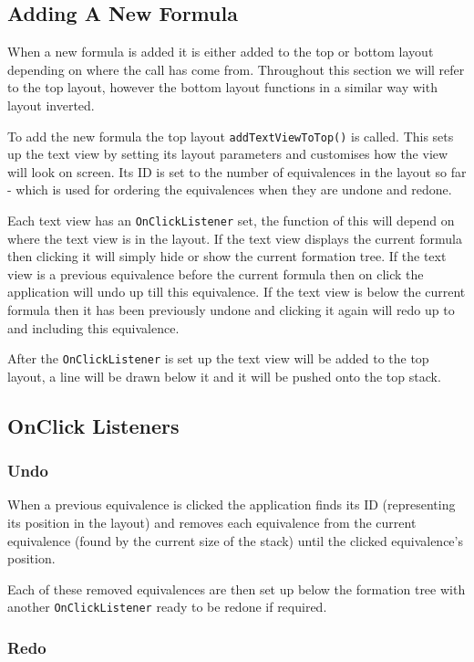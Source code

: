 \documentclass{report}
\begin{document}
\subsection{Adding A New Formula}

When a new formula is added it is either added to the top or bottom layout depending on where the call has come from. Throughout this section we will refer to the top layout, however the bottom layout functions in a similar way with layout inverted.

To add the new formula the top layout {\tt addTextViewToTop()} is called. This sets up the text view by setting its layout parameters and customises how the view will look on screen. Its ID is set to the number of equivalences in the layout so far - which is used for ordering the equivalences when they are undone and redone.

Each text view has an {\tt OnClickListener} set, the function of this will depend on where the text view is in the layout. If the text view displays the current formula then clicking it will simply hide or show the current formation tree. If the text view is a previous equivalence before the current formula then on click the application will undo up till this equivalence. If the text view is below the current formula then it has been previously undone and clicking it again will redo up to and including this equivalence.

After the {\tt OnClickListener} is set up the text view will be added to the top layout, a line will be drawn below it and it will be pushed onto the top stack.

\subsection{OnClick Listeners}

\subsubsection{Undo}

When a previous equivalence is clicked the application finds its ID (representing its position in the layout) and removes each equivalence from the current equivalence (found by the current size of the stack) until the clicked equivalence's position. 

Each of these removed equivalences are then set up below the formation tree with another {\tt OnClickListener} ready to be redone if required.

\subsubsection{Redo}
\end{document}

